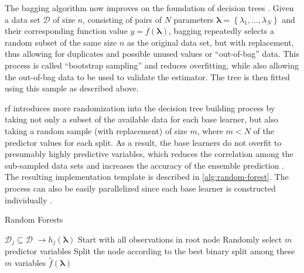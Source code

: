 The bagging algorithm now improves on the foundation of decision trees \cite{breiman1996bagging}. Given a data set $\mathcal{D}$ of size $n$, consisting of pairs of $N$ parameters $\mathbf{\lambda} = \left\lbrace \lambda_1,...,\lambda_N\right\rbrace $ and their corresponding function value $y = f(\mathbf{\lambda})$, bagging repeatedly selects a random subset of the same size $n$ as the original data set, but with replacement, thus allowing for duplicates and possible unused values or \enquote{out-of-bag} data. This process is called \enquote{bootstrap sampling} and reduces overfitting, while also allowing the out-of-bag data to be used to validate the estimator. The tree is then fitted using this sample as described above.

\gls{rf} introduces more randomization into the decision tree building process by taking not only a subset of the available data for each base learner, but also taking a random sample (with replacement) of size $m$, where $m < N$ of the predictor values for each split. As a result, the base learners do not overfit to presumably highly predictive variables, which reduces the correlation among the sub-sampled data sets and increases the accuracy of the ensemble prediction \cite{ho2002data}. The resulting implementation template is described in \cref{alg:random-forest}. The process can also be easily parallelized since each base learner is constructed individually \cite{cutler2012random}.

\begin{algorithm}
	\caption{Random Forests}
	\label{alg:random-forest}
	\begin{algorithmic}
			\State $\mathcal{D}_j \subseteq \mathcal{D}$ 
			 $ \to h_j(\mathbf{\lambda})$
				\State Start with all observations in root node
					\State Randomly select $m$ predictor variables
					\State Split the node according to the best binary split among these $m$ variables
				\EndFor
			\EndProcedure
		\EndFor
		\Return $\hat{f}(\mathbf{\lambda})$ 
	\end{algorithmic}
\end{algorithm}

